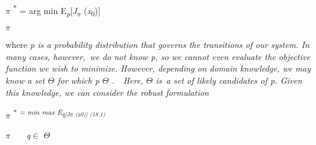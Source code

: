 \documentclass[12pt,twoside]{article}
\begin{document}
\begin{adjustwidth}{0.59in}{1.09in}
\begin{Center}
{\fontsize{10pt}{12.0pt}\selectfont \textit{$ \pi $ }\textsuperscript{$\ast$ } = arg min E\textit{\textsubscript{p}}[\textit{J\textsubscript{$ \pi $ } }(\textit{x}\textsubscript{0})]\par}
\end{Center}\par

\end{adjustwidth}

\begin{adjustwidth}{0.0in}{0.59in}
\begin{Center}
{\fontsize{7pt}{8.4pt}\selectfont \textit{$ \pi $ }\par}
\end{Center}\par

\end{adjustwidth}


\vspace{\baselineskip}
\begin{adjustwidth}{0.08in}{0.58in}
{\fontsize{10pt}{12.0pt}\selectfont where \textit{p is a probability distribution that governs the transitions of our system. In many cases, however,\  we do not know p, so we cannot even evaluate the objective function we wish to minimize. However, depending on domain knowledge, we may know a set $ \Theta $  for which p $ \Theta $ .\ \ Here,  $ \Theta $  is\ a set of likely  candidates of p. Given this knowledge, we can consider the robust formulation}\par}\par

\end{adjustwidth}

\begin{adjustwidth}{2.56in}{0.0in}
{\fontsize{10pt}{12.0pt}\selectfont \textit{$ \pi $ \textsuperscript{$\ast$  = min max E\textsubscript{q[J$ \pi $  (x0)] \tabto{6.25in} (18.1)}}}\par}\par

\end{adjustwidth}

\begin{adjustwidth}{0.34in}{1.09in}
\begin{Center}
{\fontsize{7pt}{8.4pt}\selectfont \textit{$ \pi $ \ \ \  q}$ \in $ $ \Theta $ \par}
\end{Center}\par

\end{adjustwidth}
\end{document}
